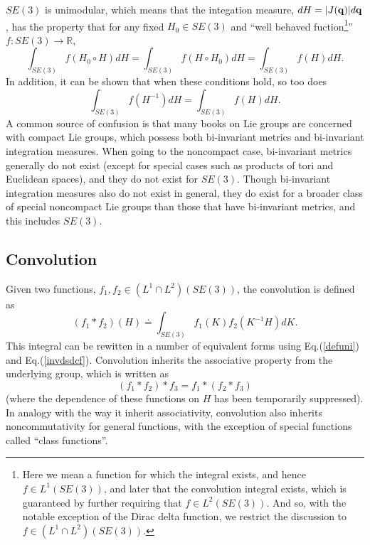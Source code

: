 \documentclass[twocolumn,10pt]{asme2ej}
\begin{document}
$SE(3)$ is unimodular, which means that the integation measure, $dH = |J({\bf q})| d{\bf q}$, has the property that for any
fixed $H_0 \in SE(3)$ and ``well behaved fuction\footnote{Here we mean a function for which the integral exists, and hence
$f \in L^1(SE(3))$, and later that the convolution integral exists, which is guaranteed by further requiring that
$f \in L^2(SE(3))$. And so, with the notable exception of the Dirac delta function, we restrict the discussion to
$f \in (L^1 \cap L^2)(SE(3))$.}'' $f:SE(3) \rightarrow \mathbb{R}$, \cite{myoldbook}
\begin{equation}
\int_{SE(3)} f(H_0 \circ H) dH = \int_{SE(3)} f(H \circ H_0) dH = \int_{SE(3)} f(H) dH.
\label{defuni}
\end{equation}
In addition, it can be shown that when these conditions hold, so too does
\begin{equation}
\int_{SE(3)} f(H^{-1}) dH = \int_{SE(3)} f(H) dH.
\label{invdsdcf}
\end{equation}
A common source of confusion is that many books on Lie groups are concerned with compact Lie groups, which possess both bi-invariant metrics
and bi-invariant integration measures. When going to the noncompact case, bi-invariant metrics generally do not exist (except for special cases
such as products of tori and Euclidean spaces), and they do not exist for $SE(3)$. Though bi-invariant integration measures also do not exist in general,
they do exist for a broader class of special noncompact Lie groups than those that have bi-invariant metrics, and this includes $SE(3)$. 

\subsection*{Convolution} \label{convsec}

Given two functions, $f_1, f_2 \in (L^1 \cap L^2)(SE(3))$, the convolution is defined as
\begin{equation}
(f_1 * f_2)(H) \doteq \int_{SE(3)} f_1(K) f_2(K^{-1} H) dK. 
\label{convdef}
\end{equation}
This integral can be rewitten in a number of equivalent forms using Eq.(\ref{defuni}) and Eq.(\ref{invdsdcf}).
Convolution inherits the associative property from the underlying group, which is written as 
$$ (f_1 * f_2) * f_3 = f_1 * (f_2 * f_3) $$
(where the dependence of these functions on $H$ has been temporarily suppressed). In analogy with the way it inherit associativity, convolution 
also inherits noncommutativity for general functions, with the exception of special functions called ``class functions''.
\end{document}
